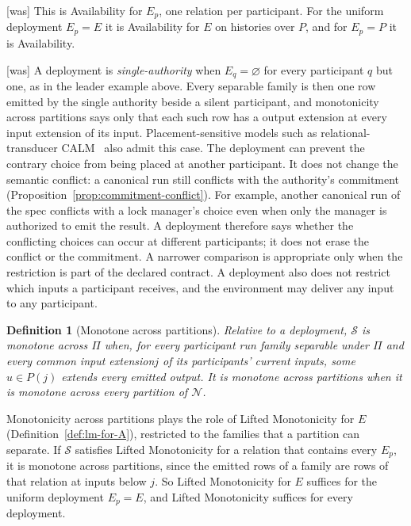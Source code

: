 \documentclass[sigconf]{cidr-2027}
\newtheorem{definition}{Definition}
\theoremstyle{remark}
\newcommand{\commitment}{commitment\xspace}
\newcommand{\indesc}{input extension\xspace} %
\newcommand{\outrel}{extends\xspace}          %
\newcommand{\outnoun}{output extension\xspace}%
\newcommand{\Spec}{\mathcal{S}}
\newcommand{\fiber}[1]{P(#1)}
\begin{document}
{\footnotesize\color{black!50}\noindent\textsf{[was]} This is Availability for $E_p$, one relation per participant.  For the uniform
deployment $E_p=E$ it is Availability for $E$ on histories over $P$, and for
$E_p=P$ it is Availability.\par}



{\footnotesize\color{black!50}\noindent\textsf{[was]} A deployment is \emph{single-authority} when $E_q=\varnothing$ for every
participant $q$ but one, as in the leader example above.  Every separable family
is then one row emitted by the single authority beside a silent participant, and
monotonicity across partitions says only that each such row has a \outnoun at
every \indesc of its input.  Placement-sensitive models such as
relational-transducer CALM~\cite{ameloot2013relational,ameloot2015weaker} also
admit this case.  The deployment can prevent the contrary choice from being
placed at another participant.  It does not change the semantic conflict: a
canonical run still conflicts with the authority's \commitment
(Proposition~\ref{prop:commitment-conflict}).  For example, another canonical
run of the spec conflicts with a lock manager's choice even when only the
manager is authorized to emit the result.  A deployment therefore
says whether the conflicting choices can occur at different participants; it
does not erase the conflict or the \commitment.  A narrower comparison is
appropriate only when the restriction is part of the declared contract.  A
deployment also does not restrict which inputs a participant receives, and the
environment may deliver any input to any participant.\par}

\color{blue!70!black}\begin{definition}[Monotone across partitions]
\label{def:monotone-across-partitions}
Relative to a deployment, $\Spec$ is \emph{monotone across $\Pi$} when, for
every participant run family separable under $\Pi$ and every common \indesc $j$
of its participants' current inputs, some $u\in\fiber{j}$ \outrel every
emitted output.  It is \emph{monotone across partitions} when it is monotone
across every partition of $\mathcal N$.\color{black}
\end{definition}

\color{blue!70!black}Monotonicity across partitions plays the role of Lifted Monotonicity for $E$
(Definition~\ref{def:lm-for-A}), restricted to the families that a partition
can separate.  If $\Spec$ satisfies Lifted Monotonicity for a relation that
contains every $E_p$, it is monotone across partitions, since the emitted rows
of a family are rows of that relation at inputs below $j$.  So Lifted
Monotonicity for $E$ suffices for the uniform deployment $E_p=E$, and Lifted
Monotonicity suffices for every deployment.\color{black}
\end{document}
